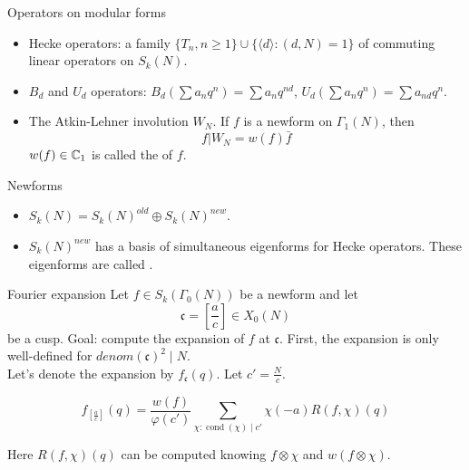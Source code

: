 \documentclass[handout]{beamer}
\newcommand{\fc}{\mathfrak{c}}
\DeclareMathOperator{\cond}{cond}
\begin{document}
\begin{frame}{Operators on modular forms}

\begin{itemize}
\item Hecke operators: a family $\{T_n, n \geq 1 \} \cup \{ \langle d \rangle: (d,N) = 1\}$ of commuting linear operators on $S_k(N)$. 

\item $B_d$ and $U_d$ operators: $B_d(\sum a_n q^n) = \sum a_{n} q^{nd}$, $U_d(\sum a_n q^n) = \sum a_{nd} q^{n}$.

\item The Atkin-Lehner involution $W_N$.  If $f$ is a newform on $\Gamma_1(N)$, then 
\[
	f | W_N = w(f) \bar{f}
\]
$w(f) \in \mathbb{C}_1$ is called the  of $f$. 

\end{itemize}

\end{frame}

\begin{frame}{Newforms}

\begin{itemize}
\item $S_k(N) = S_k(N)^{old} \oplus S_k(N)^{new}$. 
\item $S_k(N)^{new}$ has a basis of simultaneous eigenforms for   Hecke operators. These eigenforms 
are called .
\end{itemize}



\end{frame}



\begin{frame}{Fourier expansion}
Let $f \in S_k(\Gamma_0(N))$ be a newform and let $$\fc = [\frac{a}{c}] \in X_0(N)$$ be a cusp. 
Goal: compute the expansion of $f$ at $\fc$. 
First, the expansion is only well-defined for $denom(\fc)^2 \mid N$. \\ 

Let's denote the expansion by $f_{\fc}(q)$.  Let $c' = \frac{N}{c}$.
\end{frame}

\begin{frame}
\begin{theorem}[C.]
\begin{equation*} \label{expansion0}
f_{[\frac{a}{c}]} \left( q\right) = \frac{w(f) }{\varphi(c')}\sum_{\chi: \cond(\chi) \mid c'} \chi(-a) R(f,\chi)(q)
\end{equation*}

Here $R(f, \chi)(q)$ can be computed knowing $f \otimes \chi$ and $w(f \otimes \chi)$. 
\end{theorem}


\end{frame}
\end{document}
